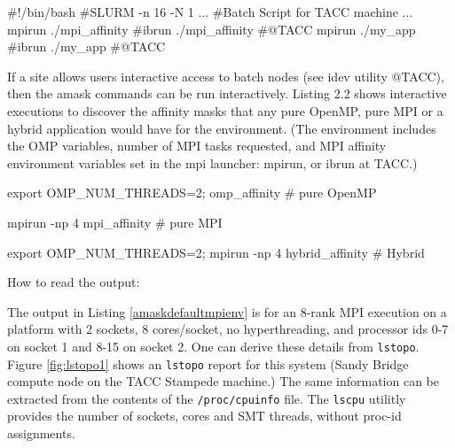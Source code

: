 \documentclass[10pt,a4paper]{report}
\begin{document}
\begin{code}[frame=single,breaklines=true,numbers=left,language=C,caption=Listing affinity masks for MPI environment \label{batchamask}]

     #!/bin/bash
     #SLURM  -n 16 -N 1
         ...
     #Batch Script for TACC machine
        ...
      mpirun ./mpi_affinity    #ibrun ./mpi_affinity #@TACC
      mpirun ./my_app          #ibrun ./my_app       #@TACC

\end{code}

If a site allows users interactive access to batch nodes (see idev utility @TACC), then
the amask commands can be run interactively. 
Listing 2.2
shows interactive executions to discover the affinity masks
that any pure OpenMP, pure MPI or a hybrid application would have for the environment.
(The environment includes the OMP variables, number of MPI tasks requested, and
MPI affinity environment variables set in the mpi launcher: mpirun, or ibrun at TACC.)

\begin{code}[frame=single,breaklines=true,numbers=left,language=C,caption=Listing OpenMP/MPI and Hybrid masks\label{interactiveamask}]

     export OMP_NUM_THREADS=2; omp_affinity   # pure OpenMP
 
     mpirun -np 4 mpi_affinity                # pure MPI
 
     export OMP_NUM_THREADS=2; mpirun -np 4 hybrid_affinity   # Hybrid

\end{code}
 


How to read the output:

The output in Listing \ref{amaskdefaultmpienv} is for an 8-rank MPI execution on a 
platform with 2 sockets, 8 cores/socket, no hyperthreading, and processor ids 0-7 
on socket 1 and 8-15 on socket 2.  
One can derive these details from \verb+lstopo+.  
Figure \ref{fig:lstopo1} shows an \verb+lstopo+ report for this system (Sandy Bridge compute 
node on the TACC Stampede machine.)
The same information can be extracted from the contents of the \verb+/proc/cpuinfo+ file.
The \verb+lscpu+ utilitly provides the number of sockets, cores and SMT threads, without
proc-id assignments.
\end{document}
